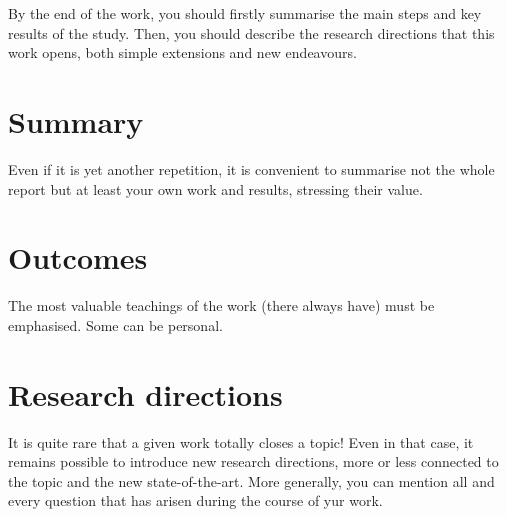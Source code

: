 By the end of the work, you should firstly summarise the main steps and key results of the study.  Then, you should describe the research directions that this work opens, both simple extensions and new endeavours.

\section{Summary}

Even if it is yet another repetition, it is convenient to summarise not the whole report but at least your own work and results, stressing their value.

\section{Outcomes}

The most valuable teachings of the work (there always have) must be emphasised.  Some can be personal.

\section{Research directions}

It is quite rare that a given work totally closes a topic!  Even in that case, it remains possible to introduce new research directions, more or less connected to the topic and the new state-of-the-art.  More generally, you can mention all and every question that has arisen during the course of yur work.